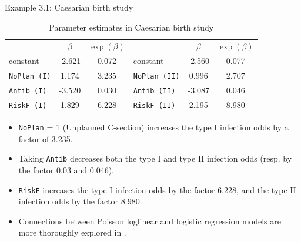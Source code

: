 \documentclass{beamer}
\begin{document}
\begin{frame}{Example 3.1: Caesarian birth study}

\begin{table} [htbp]
\caption{Parameter estimates in Caesarian birth study} \label{tab3.1}
\begin{center}
\begin{tabular}{|lcc|lcc|} \hline
 & $\beta$ & $\exp(\beta)$ & & $\beta$ & $\exp(\beta)$ \\
constant & -2.621 & 0.072 & constant & -2.560 & 0.077 \\
\texttt{NoPlan (I)} & 1.174 & 3.235 & \texttt{NoPlan (II)} & 0.996 & 2.707 \\
\texttt{Antib (I)} & -3.520 & 0.030 & \texttt{Antib (II)} & -3.087 & 0.046 \\
\texttt{RiskF (I)} & 1.829 & 6.228 & \texttt{RiskF (II)} & 2.195 & 8.980 \\ \hline
\end{tabular}
\end{center}
\end{table}
\begin{itemize}

\item
\texttt{NoPlan} = 1 (Unplanned C-section)  increases the type I infection odds by a factor of 3.235.
\item
Taking \texttt{Antib} decreases both the type I and type II infection odds (resp. by the factor 0.03 and 0.046).
\item
\texttt{RiskF} increases the type I infection odds  by the factor 6.228, and the type II infection odds by the factor 8.980.

\end{itemize}
\end{frame}


\begin{frame}
\begin{itemize}

\item Connections between Poisson loglinear and logistic regression models are more thoroughly explored in \cite[Sec. 9.5]{Agresti2013}. 


\end{itemize}

\end{frame}
\end{document}
